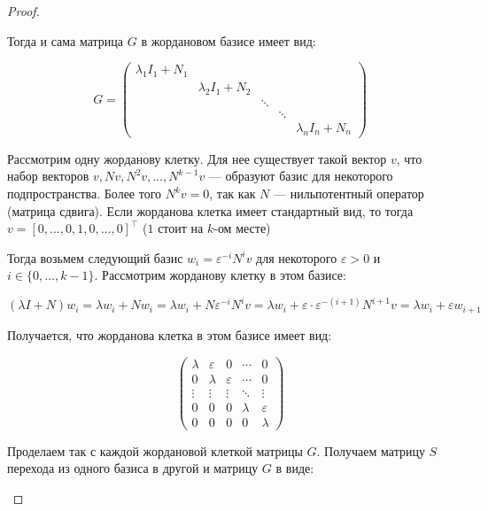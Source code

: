 \begin{proof}
\begin{itemize}
        Тогда и сама матрица $G$ в жордановом базисе имеет вид:

        \[
        G =
        \begin{pmatrix}
        \lambda_1 I_1 + N_1 &                     &        &         &  \\
                            & \lambda_2 I_1 + N_2 &        &         &  \\
                            &                     & \ddots &         &  \\
                            &                     &        &  \ddots &   \\
                            &                     &        &         & \lambda_n I_n + N_n
        \end{pmatrix}
        \]

        Рассмотрим одну жорданову клетку. Для нее существует такой вектор $v$, что набор векторов $v, N v, N^2 v, \ldots, N^{k-1} v$ --- образуют базис для некоторого подпространства. Более того $N^{k} v = 0$, так как $N$ --- нильпотентный оператор (матрица сдвига). Если жорданова клетка имеет стандартный вид, то тогда $v = [0, \ldots, 0, 1, 0, \ldots, 0]^{\top}$ ($1$ стоит на $k$-ом месте)

        Тогда возьмем следующий базис $w_i = \varepsilon^{-i} N^i v$ для некоторого $\varepsilon > 0$ и $i \in \{0, \ldots, k-1\}$. Рассмотрим жорданову клетку в этом базисе:

        \[
        (\lambda I + N) w_i = \lambda w_i + N w_i = \lambda w_i + N \varepsilon^{-i} N^i v = \lambda w_i + \varepsilon \cdot \varepsilon^{-(i+1)} N^{i+1} v = \lambda w_i + \varepsilon w_{i+1}
        \]

        Получается, что жорданова клетка в этом базисе имеет вид:

        \[
        \begin{pmatrix}
        \lambda & \varepsilon           & 0           & \cdots  & 0 \\
        0       & \lambda               & \varepsilon & \cdots  & 0 \\
        \vdots  & \vdots                & \vdots      & \ddots  & \vdots \\
        0       & 0                     & 0           & \lambda & \varepsilon \\
        0       & 0                     & 0           & 0       & \lambda
        \end{pmatrix}
        \]

        Проделаем так с каждой жордановой клеткой матрицы $G$. Получаем матрицу $S$ перехода из одного базиса в другой и матрицу $G$ в виде:


\end{itemize}
\end{proof}
